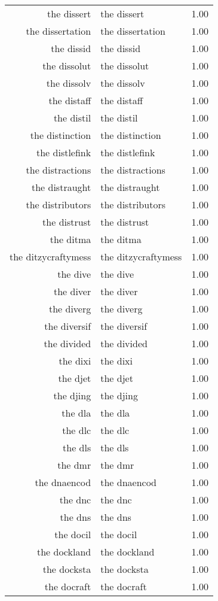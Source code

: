 \begin{table}[ht]
\begin{tabular}{rlr}
  the dissert & the dissert & 1.00 \\ 
  the dissertation & the dissertation & 1.00 \\ 
  the dissid & the dissid & 1.00 \\ 
  the dissolut & the dissolut & 1.00 \\ 
  the dissolv & the dissolv & 1.00 \\ 
  the distaff & the distaff & 1.00 \\ 
  the distil & the distil & 1.00 \\ 
  the distinction & the distinction & 1.00 \\ 
  the distlefink & the distlefink & 1.00 \\ 
  the distractions & the distractions & 1.00 \\ 
  the distraught & the distraught & 1.00 \\ 
  the distributors & the distributors & 1.00 \\ 
  the distrust & the distrust & 1.00 \\ 
  the ditma & the ditma & 1.00 \\ 
  the ditzycraftymess & the ditzycraftymess & 1.00 \\ 
  the dive & the dive & 1.00 \\ 
  the diver & the diver & 1.00 \\ 
  the diverg & the diverg & 1.00 \\ 
  the diversif & the diversif & 1.00 \\ 
  the divided & the divided & 1.00 \\ 
  the dixi & the dixi & 1.00 \\ 
  the djet & the djet & 1.00 \\ 
  the djing & the djing & 1.00 \\ 
  the dla & the dla & 1.00 \\ 
  the dlc & the dlc & 1.00 \\ 
  the dls & the dls & 1.00 \\ 
  the dmr & the dmr & 1.00 \\ 
  the dnaencod & the dnaencod & 1.00 \\ 
  the dnc & the dnc & 1.00 \\ 
  the dns & the dns & 1.00 \\ 
  the docil & the docil & 1.00 \\ 
  the dockland & the dockland & 1.00 \\ 
  the docksta & the docksta & 1.00 \\ 
  the docraft & the docraft & 1.00 \\ 

\end{tabular}
\end{table}
